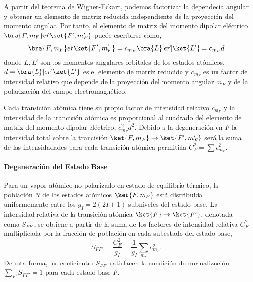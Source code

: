 A partir del teorema de Wigner-Eckart, podemos factorizar la dependecia angular y obtener un elemento de matriz reducida independiente de la proyección del momento angular. Por tanto, el elemento de matriz del momento dipolar eléctrico $\bra{F,m_F} e \hat{r} \ket{F', m_F'}$ puede escribirse como,
\begin{equation}
    \bra{F,m_F} e \hat{r} \ket{F', m_F'} = c_{m_F} \bra{L}|e\vec{r}| \ket{L'} = c_{m_F} d
\end{equation}
donde $L, L'$ son los momentos angulares orbitales de los estados atómicos, $d = \bra{L}|e\vec{r}| \ket{L'}$ es el elemento de matriz reducido y $c_{m_F}$ es un factor de intensidad relativo que depende de la proyección del momento angular $m_F$ y de la polarización del campo electromagnético.

Cada transición atómica tiene su propio factor de intensidad relativo $c_{m_F}$ y la intensidad de la trancisión atómica es proporcional al cuadrado del elemento de matriz del momento dipolar eléctrico, $c_{m_F}^2 d^2$. Debido a la degeneración en $F$ la intensidad total sobre la trancisión $\ket{F, m_F} \to \ket{F', m_F'}$ será la suma de las intensidadades para cada transición atómica permitida $C_F^2 = \sum c_{m_F}^2$.

\paragraph{Degeneración del Estado Base}
Para un vapor atómico no polarizado en estado de equilibrio térmico, la población $N$ de los estados atómicos $\ket{F, m_F}$ está distribuida uniformemente entre los $g_I = 2(2I + 1)$ subniveles del estado base. La intensidad relativa de la transición atómica $\ket{F} \to \ket{F'}$, denotada como $S_{F F'}$, se obtiene a partir de la suma de los factores de intensidad relativa $C_F^2$ multiplicada por la fracción de población en cada subestado del estado base,
\begin{equation}
    S_{F F'} = \frac{C_F^2}{g_I}= \frac{1}{g_I} \sum_{m_F} c_{m_F}^2.
\end{equation}
De esta forma, los coeficientes $S_{FF'}$ satisfacen la condición de normalización $\sum_{F'} S_{FF'} = 1$ para cada estado base $F$.


